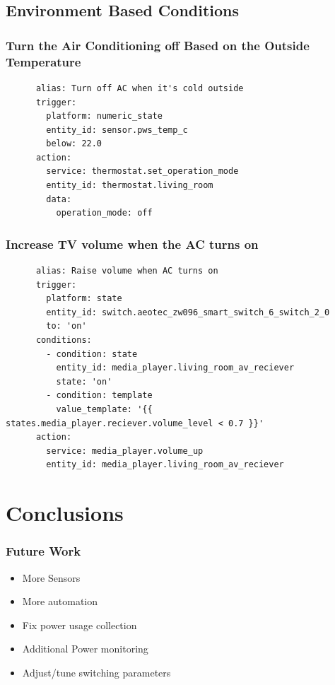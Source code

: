 \documentclass[aspectratio=169,11pt,hyperref={colorlinks=true}]{beamer}
\begin{document}
\subsection{Environment Based Conditions}
\begin{frame}[fragile=singleslide]
    \frametitle{Turn the Air Conditioning off Based on the Outside Temperature}
    \begin{verbatim}
      alias: Turn off AC when it's cold outside
      trigger:
        platform: numeric_state
        entity_id: sensor.pws_temp_c
        below: 22.0
      action:
        service: thermostat.set_operation_mode
        entity_id: thermostat.living_room
        data:
          operation_mode: off
    \end{verbatim}
\end{frame}

\begin{frame}[fragile=singleslide]
    \frametitle{Increase TV volume when the AC turns on}
    \begin{verbatim}
      alias: Raise volume when AC turns on
      trigger:
        platform: state
        entity_id: switch.aeotec_zw096_smart_switch_6_switch_2_0
        to: 'on'
      conditions:
        - condition: state
          entity_id: media_player.living_room_av_reciever
          state: 'on'
        - condition: template
          value_template: '{{ states.media_player.reciever.volume_level < 0.7 }}'
      action:
        service: media_player.volume_up
        entity_id: media_player.living_room_av_reciever
    \end{verbatim}
\end{frame}

\section{Conclusions}
\begin{frame}
    \frametitle{Future Work}
    \begin{itemize}
        \item More Sensors
        \item More automation
        \item Fix power usage collection
        \item Additional Power monitoring
        \item Adjust/tune switching parameters
    \end{itemize}
\end{frame}
\end{document}
